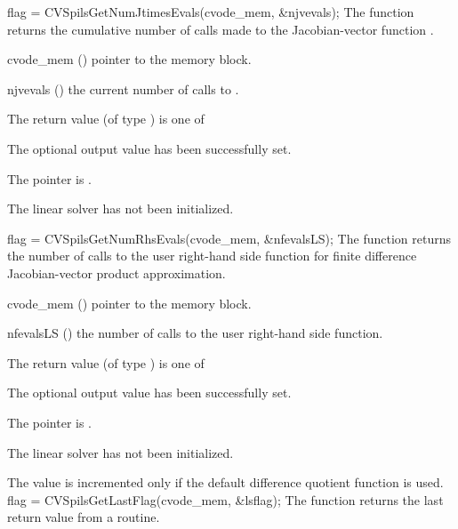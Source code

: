 {}
{
  flag = CVSpilsGetNumJtimesEvals(cvode\_mem, \&njvevals);
}
{
  The function  returns the
  cumulative number of calls made to the Jacobian-vector function
  .
}
{
  \begin{args}
  \item[cvode\_mem] ()
    pointer to the {\cvode} memory block.
  \item[njvevals] ()
    the current number of calls to .
  \end{args}
}
{
  The return value  (of type ) is one of
  \begin{args}
  \item[\Id{CVSPILS\_SUCCESS}]
    The optional output value has been successfully set.
  \item[\Id{CVSPILS\_MEM\_NULL}]
    The  pointer is .
  \item[\Id{CVSPILS\_LMEM\_NULL}]
    The {\cvspils} linear solver has not been initialized.
  \end{args}
}
{}
{
  flag = CVSpilsGetNumRhsEvals(cvode\_mem, \&nfevalsLS);
}
{
  The function  returns the
  number of calls to the user right-hand side function for
  finite difference Jacobian-vector product approximation.
}
{
  \begin{args}
  \item[cvode\_mem] ()
    pointer to the {\cvode} memory block.
  \item[nfevalsLS] ()
    the number of calls to the user right-hand side function.
  \end{args}
}
{
  The return value  (of type ) is one of
  \begin{args}
  \item[\Id{CVSPILS\_SUCCESS}]
    The optional output value has been successfully set.
  \item[\Id{CVSPILS\_MEM\_NULL}]
    The  pointer is .
  \item[\Id{CVSPILS\_LMEM\_NULL}]
    The {\cvspils} linear solver has not been initialized.
  \end{args}
}
{
  The value  is incremented only if the default
   difference quotient function is used.
}
{
  flag = CVSpilsGetLastFlag(cvode\_mem, \&lsflag);
}
{
  The function  returns the
  last return value from a {\cvspils} routine.
}
